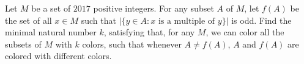 Let $M$ be a set of $2017$ positive integers.
For any subset \(A\) of \(M\), let \(f(A)\) be the set of all \(x \in M\) such that \(|\{y \in A : x\text{ is a multiple of }y\}|\) is odd.
Find the minimal natural number $k$, satisfying that, for any $M$, we can color all the subsets of $M$ with $k$ colors, such that whenever $A\neq f(A)$, $A$ and $f(A)$ are colored with different colors.

